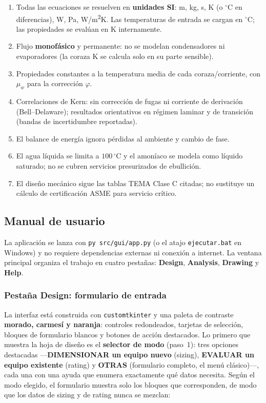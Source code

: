 \documentclass[11pt,a4paper]{article}
\begin{document}
\begin{enumerate}[leftmargin=1.6em]
\item Todas las ecuaciones se resuelven en \textbf{unidades SI}: m, kg, s, K
(o $^\circ$C en diferencias), W, Pa, W/m\textsuperscript{2}K. Las temperaturas
de entrada se cargan en $^\circ$C; las propiedades se eval\'uan en K internamente.
\item Flujo \textbf{monof\'asico} y permanente: no se modelan condensadores ni
evaporadores (la coraza K se calcula solo en su parte sensible).
\item Propiedades constantes a la temperatura media de cada coraza/corriente,
con $\mu_w$ para la correcci\'on $\varphi$.
\item Correlaciones de Kern: sin correcci\'on de fugas ni corriente de
derivaci\'on (Bell--Delaware); resultados orientativos en r\'egimen laminar y de
transici\'on (bandas de incertidumbre reportadas).
\item El balance de energ\'ia ignora p\'erdidas al ambiente y cambio de fase.
\item El agua l\'iquida se limita a $100\,^\circ$C y el amon\'iaco se modela como
l\'iquido saturado; no se cubren servicios presurizados de ebullici\'on.
\item El dise\~no mec\'anico sigue las tablas TEMA Clase C citadas; no sustituye
un c\'alculo de certificaci\'on ASME para servicio cr\'itico.
\end{enumerate}

\subsection{Manual de usuario}
\label{sec:manual}

La aplicaci\'on se lanza con \texttt{py src/gui/app.py} (o el atajo
\texttt{ejecutar.bat} en Windows) y no requiere dependencias externas ni
conexi\'on a internet. La ventana principal organiza el trabajo en cuatro
pesta\~nas: \textbf{Design}, \textbf{Analysis}, \textbf{Drawing} y
\textbf{Help}.

\subsubsection{Pesta\~na Design: formulario de entrada}

La interfaz est\'a construida con \texttt{customtkinter} y una paleta de
contraste \textbf{morado, carmes\'i y naranja}: controles redondeados,
tarjetas de selecci\'on, bloques de formulario blancos y botones de acci\'on
destacados. Lo primero que muestra la hoja de dise\~no es el
\textbf{selector de modo}
(paso~1): tres opciones destacadas ---\textbf{DIMENSIONAR un equipo nuevo}
(sizing), \textbf{EVALUAR un equipo existente} (rating) y \textbf{OTRAS}
(formulario completo, el men\'u cl\'asico)---, cada una con una ayuda que
enumera exactamente qu\'e datos necesita. Seg\'un el modo elegido, el
formulario muestra solo los bloques que corresponden, de modo que los datos
de sizing y de rating nunca se mezclan:
\end{document}
